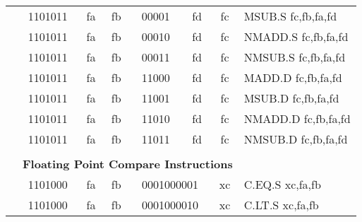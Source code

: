 \begin{table}[p]
\begin{small}
\begin{center}
\begin{tabular}{rcccccccccl}
&
\multicolumn{2}{|c|}{1101011} &
\multicolumn{1}{c|}{fa} &
\multicolumn{1}{c|}{fb} &
\multicolumn{3}{c|}{00001} &
\multicolumn{1}{c|}{fd} &
\multicolumn{1}{c|}{fc} & MSUB.S fc,fb,fa,fd \\
\cline{2-10}
  

&
\multicolumn{2}{|c|}{1101011} &
\multicolumn{1}{c|}{fa} &
\multicolumn{1}{c|}{fb} &
\multicolumn{3}{c|}{00010} &
\multicolumn{1}{c|}{fd} &
\multicolumn{1}{c|}{fc} & NMADD.S fc,fb,fa,fd \\
\cline{2-10}
  

&
\multicolumn{2}{|c|}{1101011} &
\multicolumn{1}{c|}{fa} &
\multicolumn{1}{c|}{fb} &
\multicolumn{3}{c|}{00011} &
\multicolumn{1}{c|}{fd} &
\multicolumn{1}{c|}{fc} & NMSUB.S fc,fb,fa,fd \\
\cline{2-10}
  

&
\multicolumn{2}{|c|}{1101011} &
\multicolumn{1}{c|}{fa} &
\multicolumn{1}{c|}{fb} &
\multicolumn{3}{c|}{11000} &
\multicolumn{1}{c|}{fd} &
\multicolumn{1}{c|}{fc} & MADD.D fc,fb,fa,fd \\
\cline{2-10}
  

&
\multicolumn{2}{|c|}{1101011} &
\multicolumn{1}{c|}{fa} &
\multicolumn{1}{c|}{fb} &
\multicolumn{3}{c|}{11001} &
\multicolumn{1}{c|}{fd} &
\multicolumn{1}{c|}{fc} & MSUB.D fc,fb,fa,fd \\
\cline{2-10}
  

&
\multicolumn{2}{|c|}{1101011} &
\multicolumn{1}{c|}{fa} &
\multicolumn{1}{c|}{fb} &
\multicolumn{3}{c|}{11010} &
\multicolumn{1}{c|}{fd} &
\multicolumn{1}{c|}{fc} & NMADD.D fc,fb,fa,fd \\
\cline{2-10}
  

&
\multicolumn{2}{|c|}{1101011} &
\multicolumn{1}{c|}{fa} &
\multicolumn{1}{c|}{fb} &
\multicolumn{3}{c|}{11011} &
\multicolumn{1}{c|}{fd} &
\multicolumn{1}{c|}{fc} & NMSUB.D fc,fb,fa,fd \\
\cline{2-10}
  

&
\multicolumn{9}{c}{} & \\
&
\multicolumn{9}{c}{\bf Floating Point Compare Instructions} & \\
\cline{2-10}
  

&
\multicolumn{2}{|c|}{1101000} &
\multicolumn{1}{c|}{fa} &
\multicolumn{1}{c|}{fb} &
\multicolumn{4}{c|}{0001000001} &
\multicolumn{1}{c|}{xc} & C.EQ.S xc,fa,fb \\
\cline{2-10}
  

&
\multicolumn{2}{|c|}{1101000} &
\multicolumn{1}{c|}{fa} &
\multicolumn{1}{c|}{fb} &
\multicolumn{4}{c|}{0001000010} &
\multicolumn{1}{c|}{xc} & C.LT.S xc,fa,fb \\
\cline{2-10}
  


\end{tabular}
\end{center}
\end{small}
\end{table}
